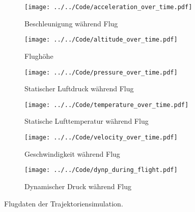 \begin{figure}
    \centering

    \begin{subfigure}{0.48\textwidth}
        \centering
        \texttt{[image: ../../Code/acceleration\_over\_time.pdf]}
        \caption{Beschleunigung während Flug}
        \label{fig:acceleration_over_time}
    \end{subfigure}
    \hfill
    \begin{subfigure}{0.48\textwidth}
        \centering
        \texttt{[image: ../../Code/altitude\_over\_time.pdf]}
        \caption{Flughöhe}
        \label{fig:altitude_over_time}
    \end{subfigure}

    \vspace{1em}

    \begin{subfigure}{0.48\textwidth}
        \centering
        \texttt{[image: ../../Code/pressure\_over\_time.pdf]}
        \caption{Statischer Luftdruck während Flug}
        \label{fig:pressure_over_time}
    \end{subfigure}
    \hfill
    \begin{subfigure}{0.48\textwidth}
        \centering
        \texttt{[image: ../../Code/temperature\_over\_time.pdf]}
        \caption{Statische Lufttemperatur während Flug}
        \label{fig:temperature_over_time}
    \end{subfigure}

    \vspace{1em}

    \begin{subfigure}{0.48\textwidth}
        \centering
        \texttt{[image: ../../Code/velocity\_over\_time.pdf]}
        \caption{Geschwindigkeit während Flug}
        \label{fig:velocity_over_time}
    \end{subfigure}
    \hfill
    \begin{subfigure}{0.48\textwidth}
        \centering
        \texttt{[image: ../../Code/dynp\_during\_flight.pdf]}
        \caption{Dynamischer Druck während Flug}
        \label{fig:dynp_over_time}
    \end{subfigure}

    \caption{Flugdaten der Trajektoriensimulation.}\label{fig:flugdaten_trajektoriensimulation}
\end{figure}

